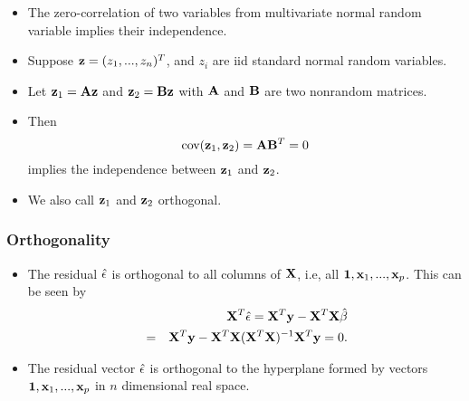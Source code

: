 \documentclass{beamer}
\def\bfX{{\bf X}}
\def\bfz{{\bf z}}
\begin{document}
      
       
       \begin{frame}
       	\frametitle{}
       	\begin{itemize}	
       		
       		\item   The zero-correlation of two variables from
       		multivariate normal random variable implies their independence.
       		
       		\item
       		Suppose ${\bf z} = (z_1, ..., z_n)^T$, and $z_i$ are iid standard normal
       		random variables.  
       		
       		\item Let ${\bf z}_1 = {\bf A} {\bf z}$ and ${\bf z}_2 = {\bf B} {\bf z}$
       		with ${\bf A}$ and ${\bf B}$ are two nonrandom matrices.
       		
       		\item  Then
       		$$ \hbox{cov} ({\bf z}_1, {\bf z}_2) = {\bf A} {\bf B}^T = 0$$
       		implies the independence between ${\bf z}_1$ and ${\bf z}_2$.
       		\item We also call
       		$\bfz_1$ and $\bfz_2$ orthogonal.
       		
       	\end{itemize}
       \end{frame}
       
      \begin{frame}
      	\frametitle{Orthogonality }
      	
      	\begin{itemize}
      		\item 
      		The residual $\hat {\bf \epsilon}$ is orthogonal to
      		all columns of $\bfX$, i.e, all ${\bf 1}, {\bf x}_1, ..., {\bf x}_p$.
      		This can be seen by
      		\begin{eqnarray*}
      			&& {\bf X}^T\hat {\bf \epsilon}= {\bf X}^T {\bf y} - {\bf X}^T{\bf X} {\hat {\bf \beta}} \\
      			&= & {\bf X}^T {\bf y} - {\bf X}^T{\bf X}({\bf X}^T{\bf X})^{-1}{\bf X}^T {\bf y} = 0.
      		\end{eqnarray*}
      		\item The residual vector $\hat {\bf \epsilon}$ is orthogonal to the hyperplane
      		formed by vectors ${\bf 1}, {\bf x}_1, ..., {\bf x}_p$ in $n$ dimensional real space.
      		
      	\end{itemize}
      \end{frame}	
      
\end{document}
